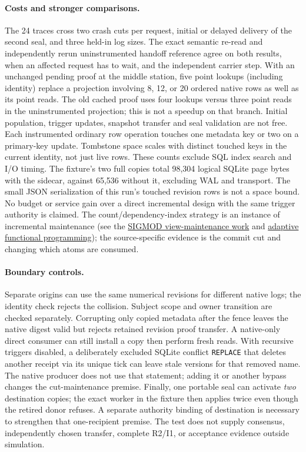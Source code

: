 \documentclass[11pt]{article}
\begin{document}
\paragraph{Costs and stronger comparisons.}
The 24 traces cross two crash cuts per request, initial or delayed
delivery of the second seal, and three held-in log sizes.
The exact semantic re-read and independently rerun uninstrumented
handoff reference agree on both results, when an affected request
has to wait, and the independent carrier step. With an unchanged
pending proof at the middle station, five point lookups (including
identity) replace a projection involving 8, 12, or 20 ordered native
rows as well as its point reads. The old cached proof uses four
lookups versus three point reads in the uninstrumented projection;
this is not a speedup on that branch. Initial population, trigger
updates, snapshot transfer and seal validation are not free. Each
instrumented ordinary row operation touches one metadata key or
two on a primary-key update. Tombstone space scales with distinct
touched keys in the current identity, not just live rows. These
counts exclude SQL index search and I/O timing. The fixture's two
full copies total 98,304 logical SQLite page bytes with the sidecar,
against 65,536 without it, excluding WAL and transport. The small
JSON serialization of this run's touched revision rows is not a space
bound. No budget or service gain over a direct incremental design with
the same trigger authority is claimed. The count/dependency-index
strategy is an instance of incremental maintenance (see the
\href{https://doi.org/10.1145/170036.170066}{SIGMOD view-maintenance
work} and \href{https://www.cs.cmu.edu/~blelloch/papers/popl02.pdf}{adaptive
functional programming}); the source-specific evidence is the commit
cut and changing which atoms are consumed.

\paragraph{Boundary controls.}
Separate origins can use the same numerical revisions for different
native logs; the identity check rejects the collision. Subject scope
and owner transition are checked separately. Corrupting only copied
metadata after the fence leaves the native digest valid but rejects
retained revision proof transfer. A native-only direct consumer can
still install a copy then perform fresh reads. With recursive
triggers disabled, a deliberately excluded SQLite conflict
\texttt{REPLACE} that deletes another receipt via its unique tick
can leave stale versions for that removed name. The native producer
does not use that statement; adding it or another bypass changes the
cut-maintenance premise. Finally, one portable seal can activate
\emph{two} destination copies; the exact worker in the fixture then
applies twice even though the retired donor refuses. A separate
authority binding of destination is necessary to strengthen that
one-recipient premise. The test does not supply consensus, independently
chosen transfer, complete R2/I1, or acceptance evidence outside simulation.
\end{document}
